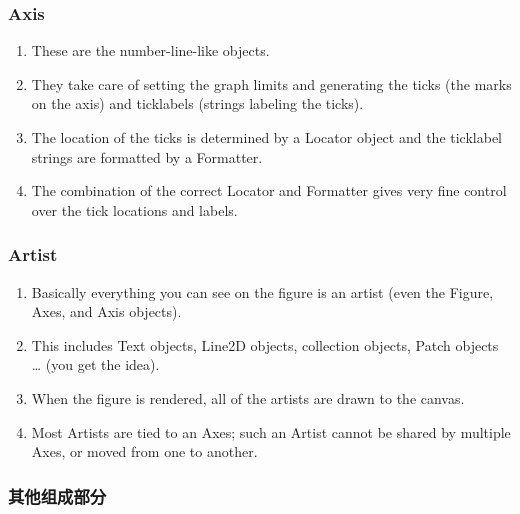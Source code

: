 \documentclass[UTF8,a4paper,12pt]{ctexart}  %
\providecommand{\tightlist}{\setlength{\itemsep}{0pt}\setlength{\parskip}{0pt}}
\begin{document}
\hypertarget{axis}{%
\subsubsection{Axis}\label{axis}}

\begin{enumerate}
\def\labelenumi{\arabic{enumi}.}
\tightlist
\item
  These are the number-line-like objects.
\item
  They take care of setting the graph limits and generating the ticks
  (the marks on the axis) and ticklabels (strings labeling the ticks).
\item
  The location of the ticks is determined by a Locator object and the
  ticklabel strings are formatted by a Formatter.
\item
  The combination of the correct Locator and Formatter gives very fine
  control over the tick locations and labels.
\end{enumerate}

\hypertarget{artist}{%
\subsubsection{Artist}\label{artist}}

\begin{enumerate}
\def\labelenumi{\arabic{enumi}.}
\tightlist
\item
  Basically everything you can see on the figure is an artist (even
  the Figure, Axes, and Axis objects).
\item
  This includes Text objects, Line2D objects, collection objects,
  Patch objects \ldots{} (you get the idea).
\item
  When the figure is rendered, all of the artists are drawn to the
  canvas.
\item
  Most Artists are tied to an Axes; such an Artist cannot be shared by
  multiple Axes, or moved from one to another.
\end{enumerate}

\hypertarget{ux5176ux4ed6ux7ec4ux6210ux90e8ux5206}{%
\subsubsection{其他组成部分}\label{ux5176ux4ed6ux7ec4ux6210ux90e8ux5206}}
\end{document}
